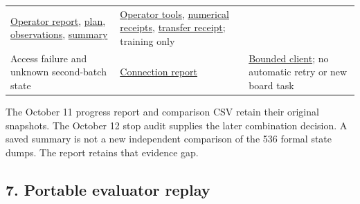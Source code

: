 \documentclass[10pt,a4paper]{article}
\begin{document}
\begin{longtable}[]{@{}lll@{}}
\begin{minipage}[t]{0.30\columnwidth}
\href{https://github.com/MoyaMryia/riscv-accl/blob/main/spacemit/reports/2026-10-12-k1-operator-data.md}{Operator
report},
\href{https://github.com/MoyaMryia/riscv-accl/blob/main/spacemit/reports/raw/k1-operator-data-20261012-r1/plan.json}{plan},
\href{https://github.com/MoyaMryia/riscv-accl/blob/main/spacemit/reports/raw/k1-operator-data-20261012-r1/observations.jsonl}{observations},
\href{https://github.com/MoyaMryia/riscv-accl/blob/main/spacemit/reports/raw/k1-operator-data-20261012-r1/summary.json}{summary}\strut
\end{minipage} & \begin{minipage}[t]{0.30\columnwidth}\raggedright
\href{https://github.com/MoyaMryia/riscv-accl/blob/main/spacemit/bench/operator-data/README.md}{Operator
tools},
\href{https://github.com/MoyaMryia/riscv-accl/blob/main/spacemit/reports/raw/k1-operator-data-20261012-r1/numeric-receipts.json}{numerical
receipts},
\href{https://github.com/MoyaMryia/riscv-accl/blob/main/spacemit/reports/raw/k1-operator-data-20261012-r1/transfer-receipt.json}{transfer
receipt}; training only\strut
\end{minipage}\tabularnewline
\begin{minipage}[t]{0.30\columnwidth}\raggedright
Access failure and unknown second-batch state\strut
\end{minipage} & \begin{minipage}[t]{0.30\columnwidth}\raggedright
\href{https://github.com/MoyaMryia/riscv-accl/blob/main/spacemit/reports/2026-10-12-k1-connection-interruption.md}{Connection
report}\strut
\end{minipage} & \begin{minipage}[t]{0.30\columnwidth}\raggedright
\href{https://github.com/MoyaMryia/riscv-accl/blob/main/spacemit/bench/operator-data/remote.py}{Bounded
client}; no automatic retry or new board task\strut
\end{minipage}\tabularnewline
\bottomrule
\end{longtable}

The October 11 progress report and comparison CSV retain their original
snapshots. The October 12 stop audit supplies the later combination
decision. A saved summary is not a new independent comparison of the 536
formal state dumps. The report retains that evidence gap.

\Needspace{250pt}

\hypertarget{portable-evaluator-replay}{%
\subsection{7. Portable evaluator
replay}\label{portable-evaluator-replay}}
\end{document}
